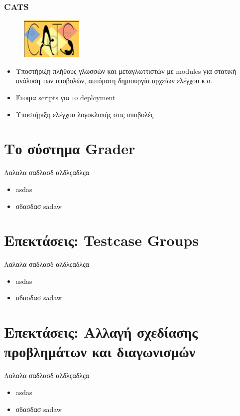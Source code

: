 \documentclass{beamer}
\begin{document}
\begin{frame}
  \frametitle{CATS}

  \begin{figure}
    \includegraphics[scale=0.7]{../Figures/cats.png}
  \end{figure}

  \begin{itemize}
      \item Υποστήριξη πλήθους γλωσσών και μεταγλωττιστών με modules για στατική
        ανάλυση των υποβολών, αυτόματη δημιουργία αρχείων ελέγχου κ.α.
      \item Έτοιμα scripts για το deployment
      \item Υποστήριξη ελέγχου λογοκλοπής στις υποβολές
  \end{itemize}
\end{frame}

\section{Το σύστημα Grader}
\begin{frame}
  Λαλαλα σαδλασδ αλδλςαδλςα
  \begin{itemize}
      \item asdas
      \item σδασδασ sadaw
  \end{itemize}
\end{frame}

\section{Επεκτάσεις: Testcase Groups}
\begin{frame}
  Λαλαλα σαδλασδ αλδλςαδλςα
  \begin{itemize}
      \item asdas
      \item σδασδασ sadaw
  \end{itemize}
\end{frame}

\section{Επεκτάσεις: Αλλαγή σχεδίασης προβλημάτων και διαγωνισμών}
\begin{frame}
  Λαλαλα σαδλασδ αλδλςαδλςα
  \begin{itemize}
      \item asdas
      \item σδασδασ sadaw
  \end{itemize}
\end{frame}
\end{document}
